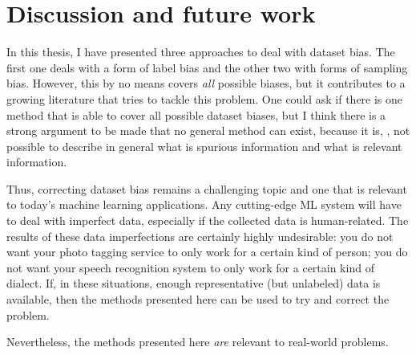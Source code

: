 \chapter{Discussion and future work}\label{ch:conclusion}
In this thesis, I have presented three approaches to deal with dataset bias.
The first one deals with a form of label bias and the other two with forms of sampling bias.
However, this by no means covers \emph{all} possible biases,
but it contributes to a growing literature that tries to tackle this problem.
One could ask if there is one method that is able to cover all possible dataset biases,
but I think there is a strong argument to be made that no general method can exist,
because it is, \eg, not possible to describe in general what is spurious information and what is relevant information.

Thus, correcting dataset bias remains a challenging topic
and one that is relevant to today's machine learning applications.
Any cutting-edge \ac{ML} system will have to deal with imperfect data,
especially if the collected data is human-related.
The results of these data imperfections are certainly highly undesirable:
you do not want your photo tagging service to only work for a certain kind of person;
you do not want your speech recognition system to only work for a certain kind of dialect.
If, in these situations, enough representative (but unlabeled) data is available,
then the methods presented here can be used to try and correct the problem.



Nevertheless, the methods presented here \emph{are} relevant to real-world problems.





